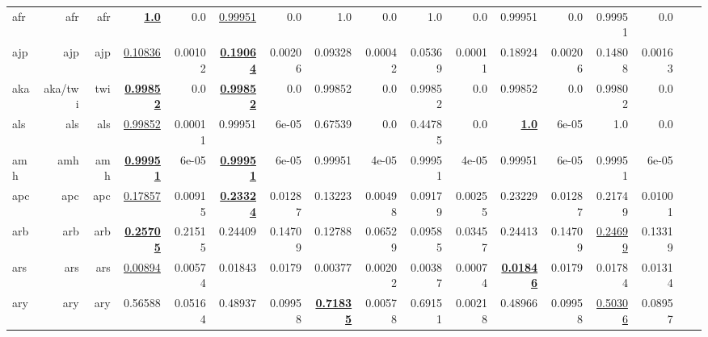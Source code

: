 \documentclass[11pt]{article}
\begin{document}
\begin{table*}[h]
{\begin{tabular}{lrrrrrrrrrrrrrrrr}
afr         & afr         & afr         & \textbf{\underline{1.0}}         & 0.0         & \underline{0.99951}         & 0.0         & 1.0         & 0.0         & 1.0         & 0.0         & 0.99951         & 0.0         & 0.99951         & 0.0         \\
ajp         & ajp         & ajp         & \underline{0.10836}         & 0.00102         & \textbf{\underline{0.19064}}         & 0.00206         & 0.09328         & 0.00042         & 0.05369         & 0.00011         & 0.18924         & 0.00206         & 0.14808         & 0.00163         \\
aka         & aka/twi         & twi         & \textbf{\underline{0.99852}}         & 0.0         & \textbf{\underline{0.99852}}         & 0.0         & 0.99852         & 0.0         & 0.99852         & 0.0         & 0.99852         & 0.0         & 0.99802         & 0.0         \\
als         & als         & als         & \underline{0.99852}         & 0.00011         & 0.99951         & 6e-05         & 0.67539         & 0.0         & 0.44785         & 0.0         & \textbf{\underline{1.0}}         & 6e-05         & 1.0         & 0.0         \\
amh         & amh         & amh         & \textbf{\underline{0.99951}}         & 6e-05         & \textbf{\underline{0.99951}}         & 6e-05         & 0.99951         & 4e-05         & 0.99951         & 4e-05         & 0.99951         & 6e-05         & 0.99951         & 6e-05         \\
apc         & apc         & apc         & \underline{0.17857}         & 0.00915         & \textbf{\underline{0.23324}}         & 0.01287         & 0.13223         & 0.00498         & 0.09179         & 0.00255         & 0.23229         & 0.01287         & 0.21749         & 0.01001         \\
arb         & arb         & arb         & \textbf{\underline{0.25705}}         & 0.21515         & 0.24409         & 0.14709         & 0.12788         & 0.06529         & 0.09585         & 0.03457         & 0.24413         & 0.14709         & \underline{0.24699}         & 0.13319         \\
ars         & ars         & ars         & \underline{0.00894}         & 0.00574         & 0.01843         & 0.0179         & 0.00377         & 0.00202         & 0.00387         & 0.00074         & \textbf{\underline{0.01846}}         & 0.0179         & 0.01784         & 0.01314         \\
ary         & ary         & ary         & 0.56588         & 0.05164         & 0.48937         & 0.09958         & \textbf{\underline{0.71835}}         & 0.00578         & 0.69151         & 0.00218         & 0.48966         & 0.09958         & \underline{0.50306}         & 0.08957         \\

\end{tabular}}
\end{table*}
\end{document}
